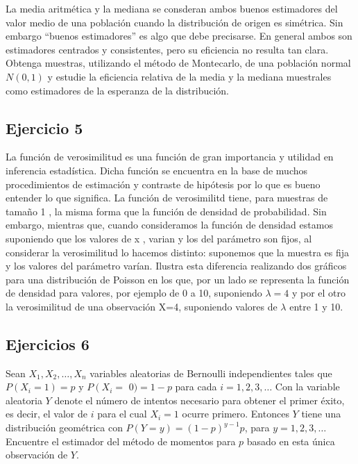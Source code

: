 \documentclass[
]{article}
\begin{document}
La media aritmética y la mediana se consderan ambos buenos estimadores del valor medio de una población cuando la distribución de origen es simétrica. Sin embargo ``buenos estimadores'' es algo que debe precisarse. En general ambos son estimadores centrados y consistentes, pero su eficiencia no resulta tan clara.
Obtenga muestras, utilizando el método de Montecarlo, de una población normal \(N(0,1)\) y estudie la eficiencia relativa de la media y la mediana muestrales como estimadores de la esperanza de la distribución.

\subsection{Ejercicio 5}\label{ejercicio-5-2}

La función de verosimilitud es una función de gran importancia y utilidad en inferencia estadística. Dicha función se encuentra en la base de muchos procedimientos de estimación y contraste de hipótesis por lo que es bueno entender lo que significa. La función de verosimilitd tiene, para muestras de tamaño 1 , la misma forma que la función de densidad de probabilidad. Sin embargo, mientras que, cuando consideramos la función de densidad estamos suponiendo que los valores de x , varian y los del parámetro son fijos, al considerar la verosimilitud lo hacemos distinto: suponemos que la muestra es fija y los valores del parámetro varían. Ilustra esta diferencia realizando dos gráficos para una distribución de Poisson en los que, por un lado se representa la función de densidad para valores, por ejemplo de 0 a 10, suponiendo \(\lambda=4\) y por el otro la verosimilitud de una observación X=4, suponiendo valores de \(\lambda\) entre 1 y 10.

\subsection{Ejercicios 6}\label{ejercicios-6}

Sean \(X_{1}, X_{2}, \ldots, X_{n}\) variables aleatorias de Bernoulli independientes tales que \(P\left(X_{i}=1\right)=p\) y \(P\left(X_{i}=\right.\) \(0)=1-p\) para cada \(i=1,2,3, \ldots\) Con la variable aleatoria \(Y\) denote el número de intentos necesario para obtener el primer éxito, es decir, el valor de \(i\) para el cual \(X_{i}=1\) ocurre primero. Entonces \(Y\) tiene una distribución geométrica con \(P(Y=y)=(1-p)^{y-1} p\), para \(y=1,2,3, \ldots\) Encuentre el estimador del método de momentos para \(p\) basado en esta única observación de \(Y\).
\end{document}
